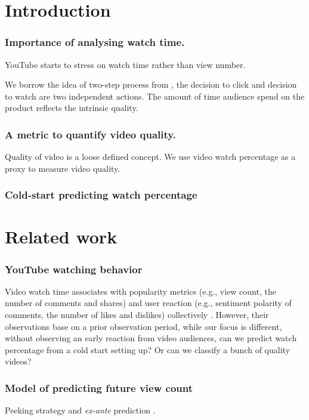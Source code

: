 \section{Introduction}

\subsubsection{Importance of analysing watch time.} YouTube starts to stress on watch time rather than view number.

We borrow the idea of two-step process from \cite{krumme2012quantifying}, the decision to click and decision to watch are two independent actions. The amount of time audience spend on the product reflects the intrinsic quality.

\subsubsection{A metric to quantify video quality.} Quality of video is a loose defined concept. We use video watch percentage as a proxy to measure video quality.

\subsubsection{Cold-start predicting watch percentage}


\section{Related work}

\subsubsection{YouTube watching behavior} Video watch time associates with popularity metrics (e.g., view count, the number of comments and shares) and user reaction (e.g., sentiment polarity of comments, the number of likes and dislikes) collectively \cite{park2016data}. However, their observations base on a prior observation period, while our focus is different, without observing an early reaction from video audiences, can we predict watch percentage from a cold start setting up? Or can we classify a bunch of quality videos?

\subsubsection{Model of predicting future view count} Peeking strategy and \textit{ex-ante} prediction \cite{martin2016exploring}.

